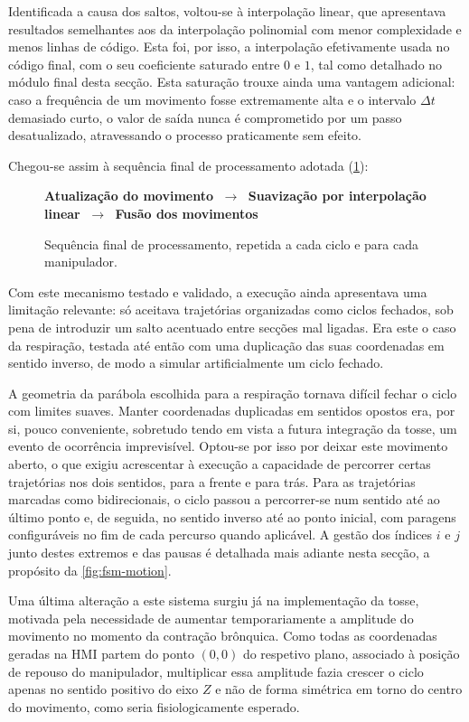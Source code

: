Identificada a causa dos saltos, voltou-se à interpolação linear, que apresentava resultados semelhantes aos da interpolação polinomial com menor complexidade e menos linhas de código. Esta foi, por isso, a interpolação efetivamente usada no código final, com o seu coeficiente saturado entre \(0\) e \(1\), tal como detalhado no módulo final desta secção. Esta saturação trouxe ainda uma vantagem adicional: caso a frequência de um movimento fosse extremamente alta e o intervalo \(\Delta t\) demasiado curto, o valor de saída nunca é comprometido por um passo desatualizado, atravessando o processo praticamente sem efeito.

Chegou-se assim à sequência final de processamento adotada (\cref{fig:pipeline-execucao}):

\begin{figure}[h]
  \centering
  \textbf{Atualização do movimento} \(\;\to\;\) \textbf{Suavização por interpolação linear} \(\;\to\;\) \textbf{Fusão dos movimentos}
  \caption{Sequência final de processamento, repetida a cada ciclo e para cada manipulador.}
  \label{fig:pipeline-execucao}
\end{figure}

Com este mecanismo testado e validado, a execução ainda apresentava uma limitação relevante: só aceitava trajetórias organizadas como ciclos fechados, sob pena de introduzir um salto acentuado entre secções mal ligadas. Era este o caso da respiração, testada até então com uma duplicação das suas coordenadas em sentido inverso, de modo a simular artificialmente um ciclo fechado.

A geometria da parábola escolhida para a respiração tornava difícil fechar o ciclo com limites suaves. Manter coordenadas duplicadas em sentidos opostos era, por si, pouco conveniente, sobretudo tendo em vista a futura integração da tosse, um evento de ocorrência imprevisível. Optou-se por isso por deixar este movimento aberto, o que exigiu acrescentar à execução a capacidade de percorrer certas trajetórias nos dois sentidos, para a frente e para trás. Para as trajetórias marcadas como bidirecionais, o ciclo passou a percorrer-se num sentido até ao último ponto e, de seguida, no sentido inverso até ao ponto inicial, com paragens configuráveis no fim de cada percurso quando aplicável. A gestão dos índices \(i\) e \(j\) junto destes extremos e das pausas é detalhada mais adiante nesta secção, a propósito da \cref{fig:fsm-motion}.

Uma última alteração a este sistema surgiu já na implementação da tosse, motivada pela necessidade de aumentar temporariamente a amplitude do movimento no momento da contração brônquica. Como todas as coordenadas geradas na HMI partem do ponto \((0,0)\) do respetivo plano, associado à posição de repouso do manipulador, multiplicar essa amplitude fazia crescer o ciclo apenas no sentido positivo do eixo \(Z\) e não de forma simétrica em torno do centro do movimento, como seria fisiologicamente esperado.

